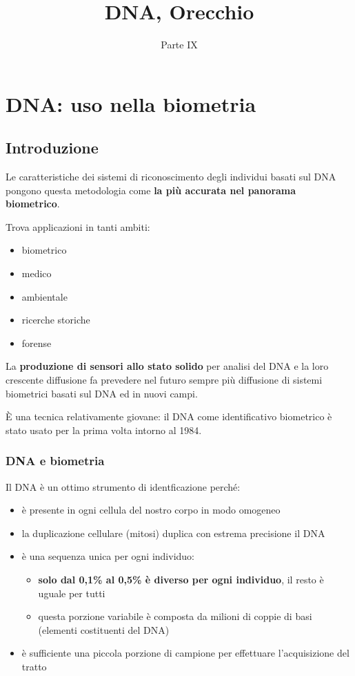 \documentclass{report}
\title{DNA, Orecchio}
\date{Parte IX}
\begin{document}
\maketitle

\tableofcontents
\newpage

\chapter{DNA: uso nella biometria}

\section{Introduzione}

Le caratteristiche dei sistemi di riconoscimento degli individui 
basati sul DNA pongono questa metodologia come \textbf{la più
accurata nel panorama biometrico}.

\noindent Trova applicazioni in tanti ambiti:
\begin{itemize}
    \item biometrico
    \item medico 
    \item ambientale 
    \item ricerche storiche 
    \item forense
\end{itemize}

\noindent La \textbf{produzione di sensori allo stato solido} per analisi del DNA e la 
loro crescente diffusione fa prevedere nel futuro sempre più diffusione di sistemi
biometrici basati sul DNA ed in nuovi campi.

\noindent È una tecnica relativamente giovane: il DNA come identificativo biometrico 
è stato usato per la prima volta intorno al 1984.

\subsection{DNA e biometria}
Il DNA è un ottimo strumento di identficazione perché:
\begin{itemize}
    \item è presente in ogni cellula del nostro corpo in modo omogeneo
    \item la duplicazione cellulare (mitosi) duplica con estrema precisione il DNA 
    \item è una sequenza unica per ogni individuo:
    \begin{itemize}
        \item \textbf{solo dal 0,1\% al 0,5\% è diverso per ogni individuo}, il resto è uguale per tutti 
        \item questa porzione variabile è composta da milioni di coppie di basi (elementi costituenti del DNA)
    \end{itemize}
    \item è sufficiente una piccola porzione di campione per effettuare l'acquisizione del tratto
\end{itemize}
\end{document}
